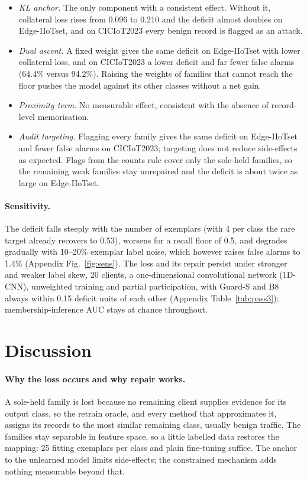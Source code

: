 \documentclass[pdflatex,sn-mathphys-num,iicol]{sn-jnl}
\begin{document}
\begin{itemize}
\item \emph{KL anchor.} The only component with a consistent effect. Without it, collateral loss rises from 0.096 to 0.210 and the deficit almost doubles on Edge-IIoTset, and on CICIoT2023 every benign record is flagged as an attack.
\item \emph{Dual ascent.} A fixed weight gives the same deficit on Edge-IIoTset with lower collateral loss, and on CICIoT2023 a lower deficit and far fewer false alarms (64.4\% versus 94.2\%). Raising the weights of families that cannot reach the floor pushes the model against its other classes without a net gain.
\item \emph{Proximity term.} No measurable effect, consistent with the absence of record-level memorisation.
\item \emph{Audit targeting.} Flagging every family gives the same deficit on Edge-IIoTset and fewer false alarms on CICIoT2023; targeting does not reduce side-effects as expected. Flags from the counts rule cover only the sole-held families, so the remaining weak families stay unrepaired and the deficit is about twice as large on Edge-IIoTset.
\end{itemize}



\paragraph{Sensitivity.} The deficit falls steeply with the number of exemplars (with 4 per class the rare target already recovers to 0.53), worsens for a recall floor of 0.5, and degrades gradually with 10--20\% exemplar label noise, which however raises false alarms to 1.4\% (Appendix Fig.~\ref{fig:sens}). The loss and its repair persist under stronger and weaker label skew, 20 clients, a one-dimensional convolutional network (1D-CNN), unweighted training and partial participation, with Guard-S and B8 always within 0.15 deficit units of each other (Appendix Table~\ref{tab:pass3}); membership-inference AUC stays at chance throughout.



\section{Discussion}\label{sec:discussion}

\paragraph{Why the loss occurs and why repair works.} A sole-held family is lost because no remaining client supplies evidence for its output class, so the retrain oracle, and every method that approximates it, assigns its records to the most similar remaining class, usually benign traffic. The families stay separable in feature space, so a little labelled data restores the mapping: 25 fitting exemplars per class and plain fine-tuning suffice. The anchor to the unlearned model limits side-effects; the constrained mechanism adds nothing measurable beyond that.
\end{document}
